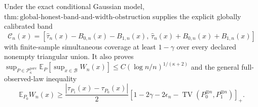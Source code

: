 Under the exact conditional Gaussian model, \(\mathrm{thm:global\text{-}honest\text{-}band\text{-}and\text{-}width\text{-}obstruction}\) supplies the explicit globally calibrated band
\[
 \mathcal C_n(x)=\left[\widehat\tau_n(x)-B_{0,n}(x)-B_{1,n}(x),\,
 \widehat\tau_n(x)+B_{0,n}(x)+B_{1,n}(x)\right]
\]
with finite-sample simultaneous coverage at least \(1-\gamma\) over every declared nonempty triangular union.  It also proves \(\sup_{P\in\mathcal P_{\kappa}^{\mathrm{perv}}}\mathbb E_P[\sup_{x\in\mathcal B}W_n(x)]\le C(\log n/n)^{1/(\kappa+2)}\) and the general full-observed-law inequality
\[
 \mathbb E_{P_0}W_n(x)\ge
 \frac{|\tau_{P_1}(x)-\tau_{P_0}(x)|}{2}
 \left[1-2\gamma-2\epsilon_n-
 \operatorname{TV}(P_0^{\otimes n},P_1^{\otimes n})\right]_+.
\]
